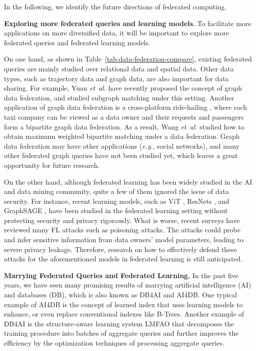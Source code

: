 \documentclass[11pt]{article}
\newcommand{\etal}{\textit{et~al.}\xspace}
\newcommand{\eg}{\textit{e.g.},\xspace}
\newcommand\tabref[1]{Table~\ref{#1}}
\newcommand{\fakeparagraph}[1]{\vspace{1mm}\noindent\textbf{#1.}}
\begin{document}
In the following, we identify the future directions of federated computing.

\fakeparagraph{Exploring more federated queries and learning models}
To facilitate more applications on more diversified data, it will be important to explore more federated queries and federated learning models.

On one hand, as shown in \tabref{tab:data-federation-compare}, existing federated queries are mainly studied over relational data and spatial data.
Other data types, such as trajectory data and graph data, are also important for data sharing.
For example, Yuan \etal \cite{DBLP:journals/pvldb/YuanMWZW21} have recently proposed the concept of graph data federation, and studied subgraph matching under this setting.
Another application of graph data federation is a cross-platform ride-hailing \cite{DBLP:conf/kdd/WangTZRXWL22}, where each taxi company can be viewed as a data owner and their requests and passengers form a bipartite graph data federation.
As a result, Wang \etal \cite{DBLP:conf/kdd/WangTZRXWL22} studied how to obtain maximum weighted bipartite matching under a data federation.
Graph data federation may have other applications (\eg social networks), and many other federated graph queries have not been studied yet, which leaves a great opportunity for future research.

On the other hand, although federated learning has been widely studied in the AI and data mining community, quite a few of them ignored the issue of data security.
For instance, recent learning models, such as ViT \cite{DBLP:conf/iclr/DosovitskiyB0WZ21}, ResNets \cite{DBLP:conf/cvpr/HeZRS16}, and GraphSAGE \cite{DBLP:conf/nips/HamiltonYL17}, have been studied in the federated learning setting without protecting security and privacy rigorously. 
What is worse, recent surveys \cite{DBLP:journals/csur/YinZH21} have reviewed many FL attacks such as poisoning attacks. The attacks could probe and infer sensitive information from data owners' model parameters, leading to severe privacy leakage.
Therefore, research on how to effectively defend these attacks for the aforementioned models in federated learning is still anticipated.

\fakeparagraph{Marrying Federated Queries and Federated Learning}
In the past five years, we have seen many promising results of marrying artificial intelligence (AI) and databases (DB), which is also known as DB4AI and AI4DB. One typical example of AI4DB is the concept of learned index \cite{DBLP:conf/sigmod/KraskaBCDP18} that uses learning models to enhance, or even replace conventional indexes like B-Trees. Another example of DB4AI is the structure-aware learning system \textsf{LMFAO} \cite{DBLP:journals/pvldb/Olteanu20} that decomposes the training procedure into batches of aggregate queries and further improves the efficiency by the optimization techniques of processing aggregate queries.
\end{document}
